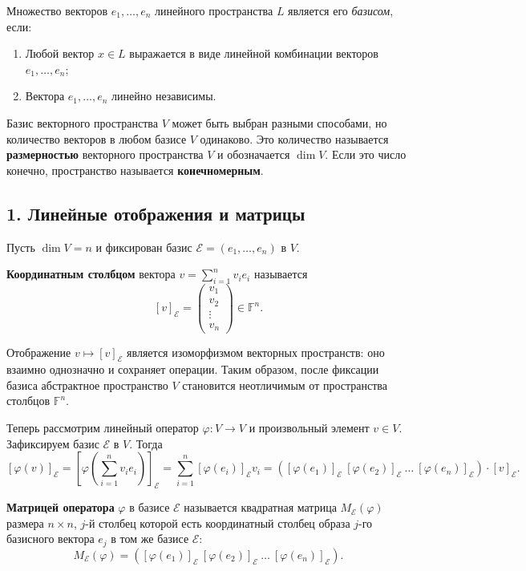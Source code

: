 \begin{definition}
    Множество векторов $e_1, \dots, e_n$ линейного пространства $L$ является его \textit{базисом}, если:
\begin{enumerate}
    \item[1)] Любой вектор $x \in L$ выражается в виде линейной комбинации векторов $e_1, \dots, e_n$;
    \item[2)] Вектора $e_1, \dots, e_n$ линейно независимы.
\end{enumerate}
\end{definition}

Базис векторного пространства $V$ может быть выбран разными способами, но количество векторов в любом базисе $V$ одинаково. Это количество называется \textbf{размерностью} векторного пространства $V$ и обозначается $\dim V$. Если это число конечно, пространство называется \textbf{конечномерным}.

\subsection*{1. Линейные отображения и матрицы}

Пусть $\dim V = n$ и фиксирован базис $\mathcal{E} = (e_1,\dots,e_n)$ в $V$. 

\noindent\textbf{Координатным столбцом} вектора $v = \sum_{i=1}^n v_i e_i$ называется
\[
[v]_\mathcal{E} = \begin{pmatrix}
v_1 \\
v_2 \\
\vdots \\
v_n
\end{pmatrix} \in \mathbb{F}^n.
\]

Отображение $v \mapsto [v]_\mathcal{E}$ является изоморфизмом векторных пространств: оно взаимно однозначно и сохраняет операции. Таким образом, после фиксации базиса абстрактное пространство $V$ становится неотличимым от пространства столбцов $\mathbb{F}^n$.

Теперь рассмотрим линейный оператор $\varphi : V \to V$ и произвольный элемент $v \in V$. Зафиксируем базис $\mathcal{E}$ в $V$. Тогда
\[
[\varphi(v)]_\mathcal{E} = \left[\varphi\left(\sum_{i=1}^n v_i e_i\right)\right]_\mathcal{E} = \sum_{i=1}^n [\varphi(e_i)]_\mathcal{E} v_i = ([\varphi(e_1)]_\mathcal{E}\ [\varphi(e_2)]_\mathcal{E}\ \dots\ [\varphi(e_n)]_\mathcal{E}) \cdot [v]_\mathcal{E}.
\]

\textbf{Матрицей оператора} $\varphi$ в базисе $\mathcal{E}$ называется квадратная матрица $M_\mathcal{E}(\varphi)$ размера $n \times n$, $j$-й столбец которой есть координатный столбец образа $j$-го базисного вектора $e_j$ в том же базисе $\mathcal{E}$:
\[
M_\mathcal{E}(\varphi) = ([\varphi(e_1)]_\mathcal{E}\ [\varphi(e_2)]_\mathcal{E}\ \dots\ [\varphi(e_n)]_\mathcal{E}).
\]


